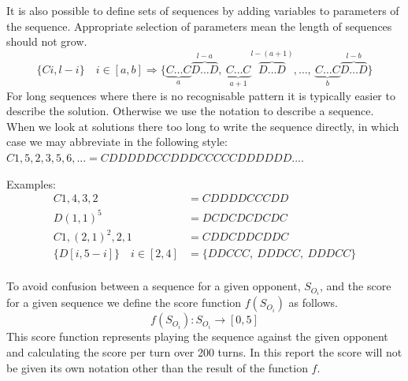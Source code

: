 It is also possible to define sets of sequences by adding variables to parameters of the sequence.
Appropriate selection of parameters mean the length of sequences should not grow.
\[ \{Ci,l-i\} \quad i\in [a,b] \Rightarrow \{\underbrace{C\ldots C}_{a}\overbrace{D\ldots D}^{l-a},\ \underbrace{C\ldots C}_{a+1}\overbrace{D\ldots D}^{l-(a+1)},\ldots ,\ \underbrace{C\ldots C}_{b}\overbrace{D\ldots D}^{l-b}\} \]
For long sequences where there is no recognisable pattern it is typically easier to describe the solution.
Otherwise we use the notation to describe a sequence.
When we look at solutions there too long to write the sequence directly, in which case we may abbreviate in the following style: $C1,5,2,3,5,6,...=CDDDDDCCDDDCCCCCDDDDDD...$.

Examples:
\begin{align}
    C1,4,3,2 &= CDDDDCCCDD\\
    D(1,1)^{5} &= DCDCDCDCDC\\
    C1,(2,1)^{2},2,1 &= CDDCDDCDDC\\
    \{D[i,5-i]\} \quad i\in [2,4] &= \{DDCCC,\ DDDCC,\ DDDCC\}\\
\end{align}

To avoid confusion between a sequence for a given opponent, $S_{O_i}$, and the score for a given sequence we define the score function $f(S_{O_i})$ as follows.
$$f(S_{O_i}):S_{O_i} \rightarrow [0,5]$$
This score function represents playing the sequence against the given opponent and calculating the score per turn over 200 turns. 
In this report the score will not be given its own notation other than the result of the function $f$.

